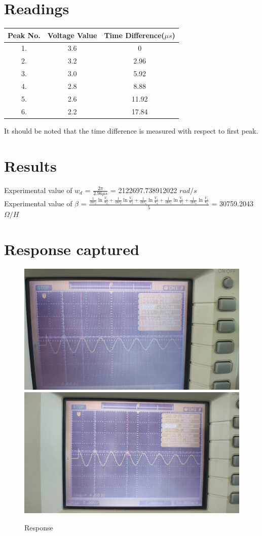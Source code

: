 \documentclass[a4paper,12pt]{article}
\begin{document}
\section{Readings}
\begin{table}[htbp]
  \centering\begin{tabular}{|c|c|c|}
    \hline
    Peak No. & Voltage Value & Time Difference($\mu s$)\\
    \hline
    1. & 3.6 & 0 \\
    \hline
    2. & 3.2 & 2.96 \\
    \hline
    3. & 3.0 & 5.92 \\
    \hline
    4. & 2.8 & 8.88 \\
    \hline
    5. & 2.6 & 11.92 \\
    \hline
    6. & 2.2 & 17.84 \\
    \hline
  \end{tabular}
\end{table}
It should be noted that the time difference is measured with respect to first peak.
\section{Results}
Experimental value of $w_d$ = $\frac{2\pi}{2.96 \mu s}$ = 2122697.738912022 $rad/s$\\
Experimental value of $\beta$ = $\frac{\frac{1}{\Delta T_2}\ln{\frac{V_1}{V_2}}  
+ \frac{1}{\Delta T_3}\ln{\frac{V_1}{V_3}}+ \frac{1}{\Delta T_4}\ln{\frac{V_1}{V_4}}+ \frac{1}{\Delta T_5}\ln{\frac{V_1}{V_5}}+ \frac{1}{\Delta T_6}\ln{\frac{V_1}{V_6}}}{5}$ = 30759.2043
$\Omega / H$\\

\section{Response captured}
\begin{figure}[!htb]
  {\includegraphics[width=0.5\columnwidth]{fig1.jpeg}}
  \hspace{\fill}
  {\includegraphics[width=0.5\columnwidth]{fig2.jpeg}}
  \caption{Response}
\end{figure}
\end{document}
